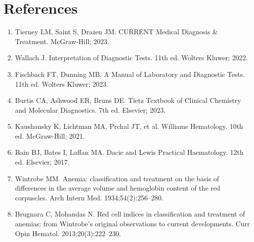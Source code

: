 \section*{References}
\begin{enumerate}
  \item Tierney LM, Saint S, Drazen JM. CURRENT Medical Diagnosis \& Treatment. McGraw-Hill; 2023.
  \item Wallach J. Interpretation of Diagnostic Tests. 11th ed. Wolters Kluwer; 2022.
  \item Fischbach FT, Dunning MB. A Manual of Laboratory and Diagnostic Tests. 11th ed. Wolters Kluwer; 2023.
  \item Burtis CA, Ashwood ER, Bruns DE. Tietz Textbook of Clinical Chemistry and Molecular Diagnostics. 7th ed. Elsevier; 2023.
  \item Kaushansky K, Lichtman MA, Prchal JT, et al. Williams Hematology. 10th ed. McGraw-Hill; 2021.
  \item Bain BJ, Bates I, Laffan MA. Dacie and Lewis Practical Haematology. 12th ed. Elsevier; 2017.
  \item Wintrobe MM. Anemia: classification and treatment on the basis of differences in the average volume and hemoglobin content of the red corpuscles. Arch Intern Med. 1934;54(2):256--280.
  \item Brugnara C, Mohandas N. Red cell indices in classification and treatment of anemias: from Wintrobe's original observations to current developments. Curr Opin Hematol. 2013;20(3):222--230.
\end{enumerate}

\clearpage
